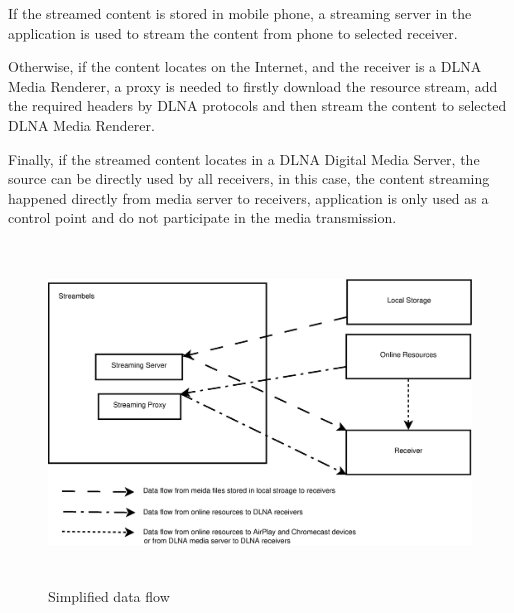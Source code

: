 If the streamed content is stored in mobile phone, a streaming server in the
application is used to stream the content from phone to selected receiver.

Otherwise, if the content locates on the Internet, and the receiver is a DLNA
Media Renderer, a proxy is needed to firstly download the resource stream, add
the required headers by DLNA protocols and then stream the content to selected
DLNA Media Renderer.

Finally, if the streamed content locates in a DLNA Digital Media Server, the
source can be directly used by all receivers, in this case, the content
streaming happened directly from media server to receivers, application is only
used as a control point and do not participate in the media transmission.

\begin{figure}[htb]
\centering \includegraphics[height=9cm]{charts/data_flow}
\caption{Simplified data flow \label{chart4}}
\end{figure}

